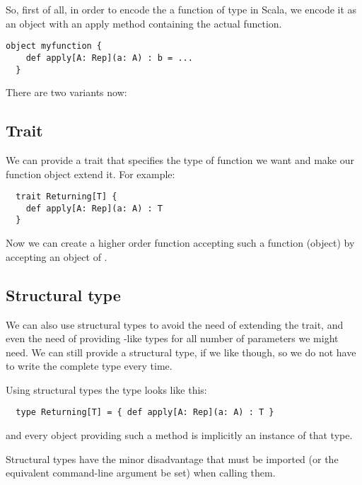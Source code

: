 So, first of all, in order to encode the a function of type 
in Scala, we encode it as an object with an apply method containing the actual
function.
\begin{lstlisting}[caption=Encoding a universal function]
  object myfunction {
    def apply[A: Rep](a: A) : b = ...
  }
\end{lstlisting}
There are two variants now:

\subsection{Trait}
We can provide a  trait that specifies the type of function we want and make our
function object extend it. For example:
\begin{lstlisting}
  trait Returning[T] {
    def apply[A: Rep](a: A) : T
  }
\end{lstlisting}
Now we can create a higher order function accepting such a function (object)
by accepting an object of .

\subsection{Structural type}
We can also use structural types to avoid the need of extending the trait, and
even the need of providing -like types for all number of parameters
we might need. We can still provide a  structural type, if we like
though, so we do not have to write the complete type every time.

Using structural types the  type looks like this:
\begin{lstlisting}
  type Returning[T] = { def apply[A: Rep](a: A) : T }
\end{lstlisting}
and every object providing such a method is implicitly an instance of that type.

Structural types have the minor disadvantage that 
must be imported (or the equivalent command-line argument be set) when calling them.

